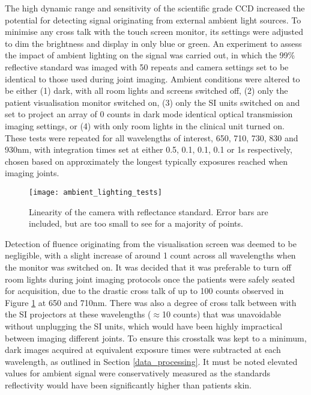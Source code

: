 \documentclass[twoside]{bhamthesis}
\theoremstyle{definition}
\begin{document}
The high dynamic range and sensitivity of the scientific grade CCD increased the potential for detecting signal originating from external ambient light sources. To minimise any cross talk with the touch screen monitor, its settings were adjusted to dim the brightness and display in only blue or green. An experiment to assess the impact of ambient lighting on the signal was carried out, in which the 99\% reflective standard was imaged with 50 repeats and camera settings set to be identical to those used during joint imaging. Ambient conditions were altered to be either (1) dark, with all room lights and screens switched off, (2) only the patient visualisation monitor switched on, (3) only the SI units switched on and set to project an array of 0 counts in dark mode identical optical transmission imaging settings, or (4) with only room lights in the clinical unit turned on. These tests were repeated for all wavelengths of interest, 650, 710, 730, 830 and 930nm, with integration times set at either 0.5, 0.1, 0.1, 0.1 or 1s respectively, chosen based on approximately the longest typically exposures reached when imaging joints.

\begin{figure}[!ht]
\centering
  \centering
  \texttt{[image: ambient\_lighting\_tests]}
\caption{Linearity of the camera with reflectance standard. Error bars are included, but are too small to see for a majority of points.}
  \label{fig:ambient_lighting_tests2}
\end{figure}

Detection of fluence originating from the visualisation screen was deemed to be negligible, with a slight increase of around 1 count across all wavelengths when the monitor was switched on. It was decided that it was preferable to turn off room lights during joint imaging protocols once the patients were safely seated for acquisition, due to the drastic cross talk of up to 100 counts observed in Figure \ref{fig:ambient_lighting_tests2} at 650 and 710nm. There was also a degree of cross talk between with the SI projectors at these wavelengths ($\approx$10 counts) that was unavoidable without unplugging the SI units, which would have been highly impractical between imaging different joints. To ensure this crosstalk was kept to a minimum, dark images acquired at equivalent exposure times were subtracted at each wavelength, as outlined in Section \ref{data_processing}. It must be noted elevated values for ambient signal were conservatively measured as the standards reflectivity would have been significantly higher than patients skin. 
\end{document}
